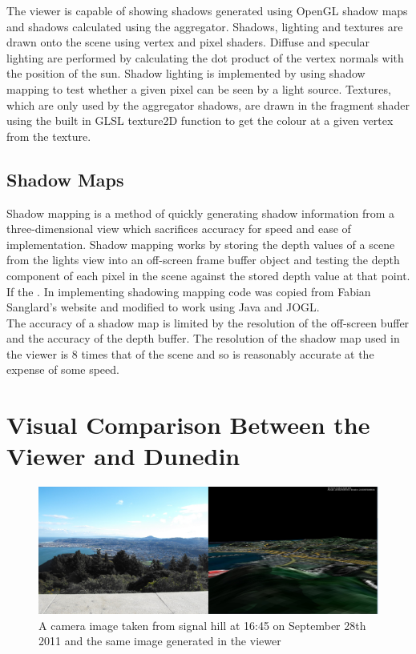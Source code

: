 \documentclass[12pt]{report}
\begin{document}
The viewer is capable of showing shadows generated using OpenGL shadow maps and shadows calculated using the aggregator. Shadows, lighting and textures are drawn onto the scene using vertex and pixel shaders. Diffuse and specular lighting are performed by calculating the dot product of the vertex normals with the position of the sun. Shadow lighting is implemented by using shadow mapping to test whether a given pixel can be seen by a light source. Textures, which are only used by the aggregator shadows, are drawn in the fragment shader using the built in GLSL texture2D function to get the colour at a given vertex from the texture.\\

\subsection{Shadow Maps}
Shadow mapping is a method of quickly generating shadow information from a three-dimensional view which sacrifices accuracy for speed and ease of implementation. Shadow mapping works by storing the depth values of a scene from the lights view into an off-screen frame buffer object and testing the depth component of each pixel in the scene against the stored depth value at that point. If the . In implementing shadowing mapping code was copied from Fabian Sanglard's website\cite{shadowb} and modified to work using Java and JOGL.\\

The accuracy of a shadow map is limited by the resolution of the off-screen buffer and the accuracy of the depth buffer. The resolution of the shadow map used in the viewer is 8 times that of the scene and so is reasonably accurate at the expense of some speed.

\section{Visual Comparison Between the Viewer and Dunedin}
\begin{figure}[h]
\centering
\includegraphics[scale=0.2]{realvsviewer.jpg}
\caption{A camera image taken from signal hill at 16:45 on September 28th 2011 and the same image generated in the viewer}
\label{image:realvsviewer}
\end{figure}
\end{document}
